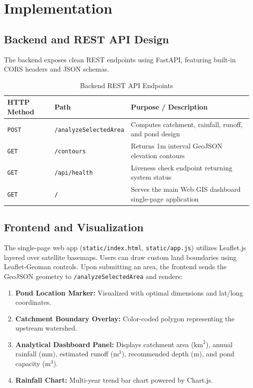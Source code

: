 \documentclass[manuscript,screen,review]{acmart}
\begin{document}
\section{Implementation}
\label{sec:implementation}

\subsection{Backend and REST API Design}
The backend exposes clean REST endpoints using FastAPI, featuring built-in CORS headers and JSON schemas.

\begin{table}[h]
  \caption{Backend REST API Endpoints}
  \label{tab:endpoints}
  \begin{tabular}{lll}
    \toprule
    HTTP Method & Path & Purpose / Description \\
    \midrule
    \texttt{POST} & \texttt{/analyzeSelectedArea} & Computes catchment, rainfall, runoff, and pond design \\
    \texttt{GET} & \texttt{/contours} & Returns 1m interval GeoJSON elevation contours \\
    \texttt{GET} & \texttt{/api/health} & Liveness check endpoint returning system status \\
    \texttt{GET} & \texttt{/} & Serves the main Web GIS dashboard single-page application \\
    \bottomrule
  \end{tabular}
\end{table}

\subsection{Frontend and Visualization}
The single-page web app (\texttt{static/index.html}, \texttt{static/app.js}) utilizes Leaflet.js layered over satellite basemaps. Users can draw custom land boundaries using Leaflet-Geoman controls. Upon submitting an area, the frontend sends the GeoJSON geometry to \texttt{/analyzeSelectedArea} and renders:
\begin{enumerate}
    \item \textbf{Pond Location Marker:} Visualized with optimal dimensions and lat/long coordinates.
    \item \textbf{Catchment Boundary Overlay:} Color-coded polygon representing the upstream watershed.
    \item \textbf{Analytical Dashboard Panel:} Displays catchment area ($\text{km}^2$), annual rainfall (mm), estimated runoff ($\text{m}^3$), recommended depth (m), and pond capacity ($\text{m}^3$).
    \item \textbf{Rainfall Chart:} Multi-year trend bar chart powered by Chart.js.
\end{enumerate}
\end{document}

